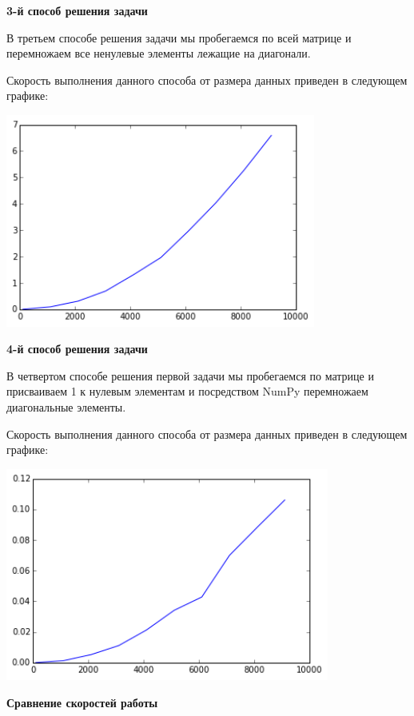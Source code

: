 \documentclass[12pt, a4paper]{article}
\begin{document}
			{\bf 3-й способ решения задачи\\}

				В третьем способе решения задачи мы пробегаемся по всей матрице и перемножаем все ненулевые элементы лежащие на диагонали.

				Скорость выполнения данного способа от размера данных приведен в следующем графике:
				\begin{center}
					\includegraphics[height=7cm]{timeit/num1_ti3.png}
				\end{center}


			{\bf 4-й способ решения задачи\\}

				В четвертом способе решения первой задачи мы пробегаемся по матрице и присваиваем 1 к нулевым элементам и посредством NumPy перемножаем диагональные элементы.

				Скорость выполнения данного способа от размера данных приведен в следующем графике:
				\begin{center}
					\includegraphics[height=7cm]{timeit/num1_ti4.png}
				\end{center}


			{\bf Сравнение скоростей работы\\}
\end{document}
